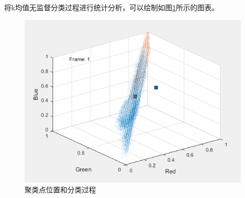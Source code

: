 将k均值无监督分类过程进行统计分析，可以绘制如图\ref{fig:airport_44_animate}所示的图表。
\begin{figure}[H]
	\centering
	\animategraphics
	\includegraphics[width=0.7\linewidth]{figure/airport_44_Clustering_Animation.gif}
	\caption{聚类点位置和分类过程}
	\label{fig:airport_44_animate}
\end{figure}